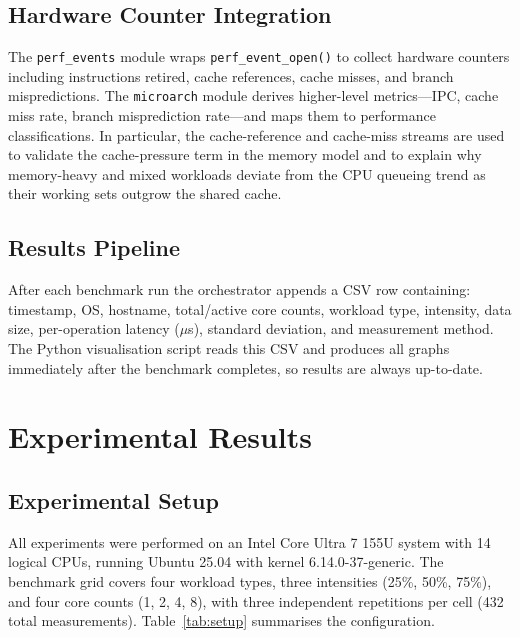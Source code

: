 \documentclass[conference]{IEEEtran}
\begin{document}
\subsection{Hardware Counter Integration}

The \texttt{perf\_events} module wraps \texttt{perf\_event\_open()} to collect
hardware counters including instructions retired, cache references, cache
misses, and branch mispredictions.  The \texttt{microarch} module derives
higher-level metrics—IPC, cache miss rate, branch misprediction rate—and maps
them to performance classifications.  In particular, the cache-reference and
cache-miss streams are used to validate the cache-pressure term in the memory
model and to explain why memory-heavy and mixed workloads deviate from the CPU
queueing trend as their working sets outgrow the shared cache.

\subsection{Results Pipeline}

After each benchmark run the orchestrator appends a CSV row containing:
timestamp, OS, hostname, total/active core counts, workload type, intensity,
data size, per-operation latency ($\mu$s), standard deviation, and
measurement method.  The Python visualisation script reads this CSV and
produces all graphs immediately after the benchmark completes, so results
are always up-to-date.

\section{Experimental Results}
\label{sec:results}

\subsection{Experimental Setup}

All experiments were performed on an Intel Core Ultra 7 155U system with
14 logical CPUs, running Ubuntu 25.04 with kernel 6.14.0-37-generic.  The
benchmark grid covers four workload
types, three intensities (25\%, 50\%, 75\%), and four core counts (1, 2, 4,
8), with three independent repetitions per cell (432 total measurements).
Table~\ref{tab:setup} summarises the configuration.
\end{document}
